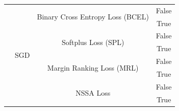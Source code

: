 \begin{table}[t]
\begin{tabular}{|c|c|c|c|}
    & \multirow{8}{*}{SGD} 
      & \multirow{2}{*}{Binary Cross Entropy Loss (BCEL)} & False \\ \cline{4-4}
    &   &                                               & True  \\ \cline{3-4}
    &   & \multirow{2}{*}{Softplus Loss (SPL)}           & False \\ \cline{4-4}
    &   &                                               & True  \\ \cline{3-4}
    &   & \multirow{2}{*}{Margin Ranking Loss (MRL)}      & False \\ \cline{4-4}
    &   &                                               & True  \\ \cline{3-4}
    &   & \multirow{2}{*}{NSSA Loss}                      & False \\ \cline{4-4}
    &   &                                               & True  \\ \hline
  \end{tabular}
\end{table}


